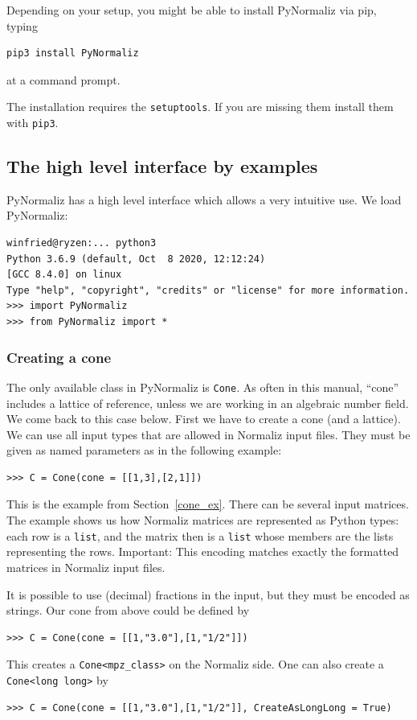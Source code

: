 \begin{small}
Depending on your setup, you might be able to install PyNormaliz via pip, typing
\begin{Verbatim}
pip3 install PyNormaliz
\end{Verbatim}
at a command prompt.

The installation requires the \verb|setuptools|. If you are missing them install them with  \verb|pip3|.


\subsection{The high level interface by examples}

PyNormaliz has a high level interface which allows a very intuitive use. We load PyNormaliz:
\begin{Verbatim}
winfried@ryzen:... python3
Python 3.6.9 (default, Oct  8 2020, 12:12:24) 
[GCC 8.4.0] on linux
Type "help", "copyright", "credits" or "license" for more information.
>>> import PyNormaliz
>>> from PyNormaliz import *
\end{Verbatim}

\subsubsection{Creating a cone}

The only available class in PyNormaliz is \verb|Cone|. As often in this manual, ``cone'' includes a lattice of reference, unless we are working in an algebraic number field. We come back to this case below. First we have to create a cone (and a lattice). We can use all input types that are allowed in Normaliz input files. They must be given as named parameters as in the following example:
\begin{Verbatim}
>>> C = Cone(cone = [[1,3],[2,1]])
\end{Verbatim}
This is the example from Section~\ref{cone_ex}. There can be several input matrices. The example shows us how Normaliz matrices are represented as Python types: each row is a \verb|list|, and the matrix then is a \verb|list| whose members are the lists representing the rows. Important: This encoding matches exactly the formatted matrices in Normaliz input files.

It is possible to use (decimal) fractions in the input, but they must be encoded as strings. Our cone from above could be defined by
\begin{Verbatim}
>>> C = Cone(cone = [[1,"3.0"],[1,"1/2"]])
\end{Verbatim}
This creates a \verb|Cone<mpz_class>| on the Normaliz side. One can also create a \verb|Cone<long long>| by
\begin{Verbatim}
>>> C = Cone(cone = [[1,"3.0"],[1,"1/2"]], CreateAsLongLong = True)
\end{Verbatim}


\end{small}
